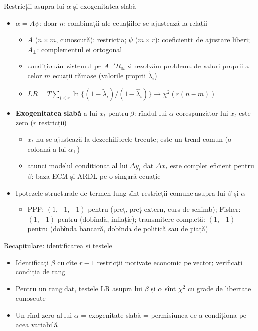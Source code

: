 \begin{frame}{Restricții asupra lui $\alpha$ și exogenitatea slabă}
\itemsize{\small}
\begin{itemize}
    \item $\alpha = A\psi$: doar $m$ combinații ale ecuațiilor se ajustează la relații
    \begin{itemize}
        \item $A$ ($n\times m$, cunoscută): restricția; $\psi$ ($m\times r$): coeficienții de ajustare liberi; $A_\perp$: complementul ei ortogonal
        \item condiționăm sistemul pe $A_\perp'R_{0t}$ și rezolvăm problema de valori proprii a celor $m$ ecuații rămase (valorile proprii $\tilde\lambda_i$)
        \item $LR = T\sum_{i\le r}\ln\{(1 - \tilde\lambda_i)/(1 - \hat\lambda_i)\} \to \chi^2(r(n - m))$
    \end{itemize}
    \item \textbf{Exogenitatea slabă} a lui $x_t$ pentru $\beta$: rîndul lui $\alpha$ corespunzător lui $x_t$ este zero ($r$ restricții)
    \begin{itemize}
        \item $x_t$ nu se ajustează la dezechilibrele trecute; este un trend comun (o coloană a lui $\alpha_\perp$)
        \item atunci modelul condiționat al lui $\Delta y_t$ dat $\Delta x_t$ este complet eficient pentru $\beta$: baza ECM și ARDL pe o singură ecuație
    \end{itemize}
    \item Ipotezele structurale de termen lung sînt restricții comune asupra lui $\beta$ și $\alpha$
    \begin{itemize}
        \item PPP: $(1, -1, -1)$ pentru (preț, preț extern, curs de schimb); Fisher: $(1, -1)$ pentru (dobîndă, inflație); transmitere completă: $(1, -1)$ pentru (dobînda bancară, dobînda de politică sau de piață)
    \end{itemize}
\end{itemize}
\end{frame}

\begin{frame}{Recapitulare: identificarea și testele}
\itemsize{\small}
\begin{itemize}
    \item Identificați $\beta$ cu cîte $r - 1$ restricții motivate economic pe vector; verificați condiția de rang
    \item Pentru un rang dat, testele LR asupra lui $\beta$ și $\alpha$ sînt $\chi^2$ cu grade de libertate cunoscute
    \item Un rînd zero al lui $\alpha$ = exogenitate slabă = permisiunea de a condiționa pe acea variabilă
\end{itemize}
\end{frame}


